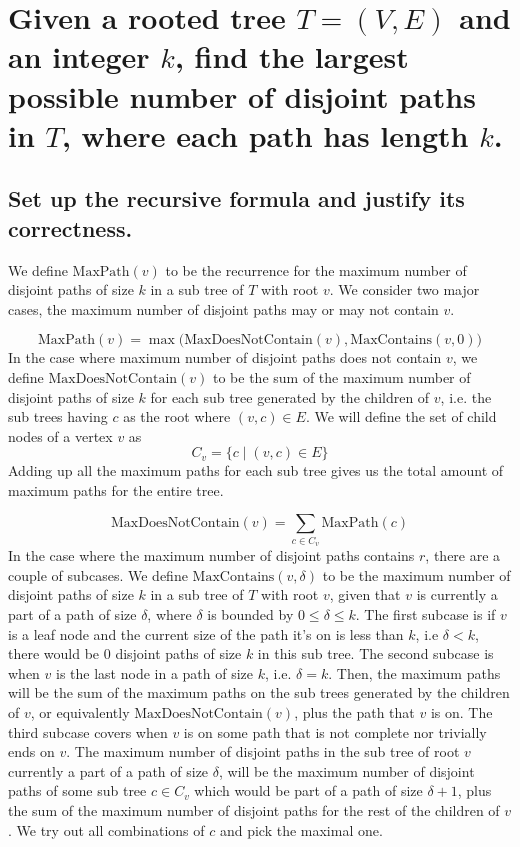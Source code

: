 \documentclass[11pt]{scrartcl}
\newcommand{\maxp}{\text{MaxPath}}
\newcommand{\ctn}{\text{MaxContains}}
\newcommand{\dctn}{\text{MaxDoesNotContain}}
\begin{document}
\section{
	Given a	rooted tree $T = (V, E)$ and an integer $k$, find the largest possible 
	number of disjoint paths in $T$, where each path has length $k$.
 }
\subsection{
	Set up the recursive formula and justify its correctness.
}
We define $\maxp(v)$ to be the recurrence for the maximum number of disjoint paths of size $k$ in a sub tree
of $T$ with root $v$. We consider two major cases, the maximum number of disjoint paths may or 
may not contain $v$. 

$$
\maxp(v) = \max \Big(\dctn(v), \ctn(v, 0) \Big)
$$
In the case where maximum number of disjoint paths does not contain $v$, we define 
$\dctn(v)$ to be the sum of   
the maximum number of disjoint paths of size $k$ for each sub tree generated by the children of $v$, 
i.e. the sub trees having $c$ as the root where $(v,c) \in E$.
We will define the set of child nodes of a vertex $v$ as $$C_v = \Big\{c \mid (v,c) \in E\Big\}$$
Adding up all the maximum paths for each sub tree
gives us the total amount of maximum paths for the entire tree. 

$$
\dctn(v) = \sum_{c \in C_v } \maxp(c)
$$
In the case where the maximum number of disjoint paths contains $r$, there are a couple of subcases.
We define $\ctn(v,\delta)$ to be the maximum number of disjoint paths of size $k$
in a sub tree of $T$ with root $v$, given that 
$v$ is currently a part of a path of size $\delta$, where $\delta$ is bounded by $0 \leq \delta \leq k$.
The first subcase is if $v$ is a leaf node and the current size of the path it's on is less than $k$, 
i.e $\delta < k$, there would be $0$ disjoint paths of size $k$ in this sub tree. 
The second subcase is when $v$ is the last node in a path of size $k$, i.e. $\delta = k$. Then, the 
maximum paths will be the sum of the maximum paths on the sub trees generated by the children of 
$v$, or equivalently $\dctn(v)$, plus the path that $v$ is on.  
The third subcase covers when $v$ is on some path that is not complete nor trivially ends on $v$.
The maximum number of disjoint paths in the sub tree of root $v$ currently a part of a path of size $\delta$,
will be the maximum number of disjoint paths of some sub tree $c \in C_v$ which would be 
part of a path of size $\delta + 1$, plus the sum of the maximum number of disjoint paths for 
the rest of the children of $v$. We try out all combinations of $c$ and pick the maximal one.
\end{document}
